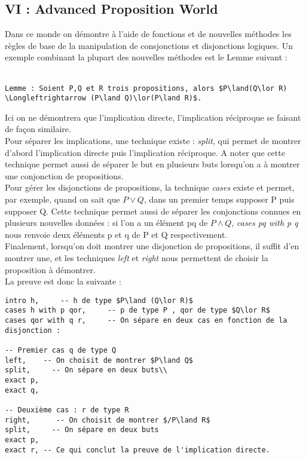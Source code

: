 \subsection{VI : Advanced Proposition World}
Dans ce monde on démontre à l'aide de fonctions et de nouvelles méthodes les règles de base de la manipulation de consjonctions et disjonctions logiques. Un exemple combinant la plupart des nouvelles méthodes est le Lemme suivant : \\
\\
\begin{verbatim}
Lemme : Soient P,Q et R trois propositions, alors $P\land(Q\lor R) \Longleftrightarrow (P\land Q)\lor(P\land R)$.
\end{verbatim}
Ici on ne démontrera que l'implication directe, l'implication réciproque se faisant de façon similaire.\\
Pour séparer les implications, une technique existe : \textit{split}, qui permet de montrer d'abord l'implication directe puis l'implication réciproque. A noter que cette technique permet aussi de séparer le but en plusieurs buts lorsqu'on a à montrer une conjonction de propositions.\\
Pour gérer les disjonctions de propositions, la technique \textit{cases} existe et permet, par exemple, quand on sait que $P\lor Q$, dans un premier temps supposer P puis supposer Q. Cette technique permet aussi de séparer les conjonctions connues en plusieurs nouvelles données : si l'on a un élément pq de $P\land Q$, \textit{cases pq with p q} nous renvoie deux éléments p et q de P et Q respectivement.\\
Finalement, lorsqu'on doit montrer une disjonction de propositions, il suffit d'en montrer une, et les techniques \textit{left} et \textit{right} nous permettent de choisir la proposition à démontrer.\\
La preuve est donc la suivante : \\
\begin{verbatim}
intro h,     -- h de type $P\land (Q\lor R)$
cases h with p qor,     -- p de type P , qor de type $Q\lor R$
cases qor with q r,     -- On sépare en deux cas en fonction de la disjonction :

-- Premier cas q de type Q
left,    -- On choisit de montrer $P\land Q$
split,     -- On sépare en deux buts\\
exact p,
exact q,

-- Deuxième cas : r de type R
right,      -- On choisit de montrer $/P\land R$
split,     -- On sépare en deux buts
exact p,
exact r, -- Ce qui conclut la preuve de l'implication directe.
\end{verbatim}
